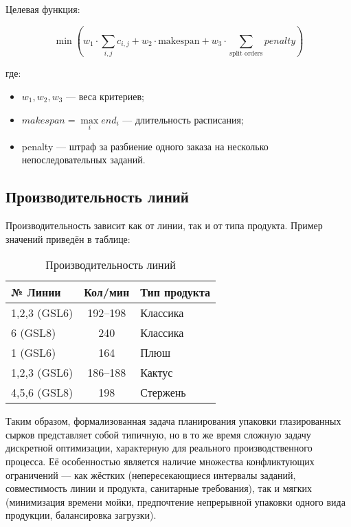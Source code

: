 Целевая функция:

\begin{equation}
    \min \left( w_1 \cdot \sum_{i,j} c_{i,j} + w_2 \cdot \text{makespan} + w_3 \cdot \sum_{\text{split orders}} penalty \right)
    \label{eq:target_function}
\end{equation}

\noindent где:
\begin{itemize}
    \item $w_1, w_2, w_3$ — веса критериев;
    \item $makespan = \max \limits_i end_i$ — длительность расписания;
    \item penalty — штраф за разбиение одного заказа на несколько непоследовательных заданий.
\end{itemize}

\subsection{Производительность линий}

Производительность зависит как от линии, так и от типа продукта. Пример значений приведён в таблице:

\begin{table}[h]
\centering
\caption{Производительность линий}
\begin{tabularx}{\textwidth}{|l|c|X|}
\hline
\textbf{№ Линии} & \textbf{Кол/мин} & \textbf{Тип продукта} \\
\hline
1,2,3 (GSL6) & 192–198 & Классика \\
\hline
6 (GSL8)     & 240     & Классика \\
\hline
1 (GSL6)     & 164     & Плюш \\
\hline
1,2,3 (GSL6) & 186–188 & Кактус \\
\hline
4,5,6 (GSL8) & 198     & Стержень \\
\hline
\end{tabularx}
\end{table}

Таким образом, формализованная задача планирования упаковки глазированных сырков представляет собой типичную, но в то же время сложную задачу дискретной оптимизации, характерную для реального производственного процесса. Её особенностью является наличие множества конфликтующих ограничений — как жёстких (непересекающиеся интервалы заданий, совместимость линии и продукта, санитарные требования), так и мягких (минимизация времени мойки, предпочтение непрерывной упаковки одного вида продукции, балансировка загрузки).

